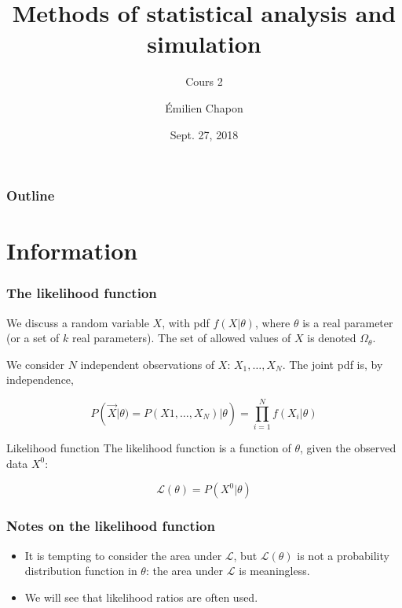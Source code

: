 \documentclass[9pt]{beamer}
\date[Stat2]{Sept. 27, 2018}
\title{Methods of statistical analysis and simulation}
\subtitle{Cours 2}
\author[E. Chapon]{Émilien Chapon}
\begin{document}
{

\begin{frame}
 \maketitle
 
\end{frame}
}



\begin{frame}
 \frametitle{Outline}
 
 \tableofcontents
\end{frame}

\section{Information}

\begin{frame}
 \frametitle{The likelihood function}
 
 We discuss a random variable $X$, with pdf $f(X|\theta)$, where $\theta$ is a real parameter (or a set of $k$ real parameters).
 The set of allowed values of $X$ is denoted $\Omega_\theta$.
 
 We consider $N$ independent observations of $X$: $X_1,\dots,X_N$. The joint pdf is, by independence,
 
 $$P(\vec{X}|\theta) = P(X1,\dots,X_N)|\theta) = \prod_{i=1}^N f(X_i|\theta)$$
 
 \begin{block}{Likelihood function}
  The likelihood function is a function of $\theta$, given the observed data $X^0$:
  
  $$\mathcal{L}(\theta) = P(X^0|\theta)$$
 \end{block}

  
\end{frame}

\begin{frame}
 \frametitle{Notes on the likelihood function}
 
 \begin{itemize}
  \item It is tempting to consider the area under $\mathcal{L}$, but $\mathcal{L}(\theta)$ is not a probability distribution function in $\theta$: \alert{the area under $\mathcal{L}$ is meaningless}.
  \item We will see that likelihood ratios are often used.
 \end{itemize}


\end{frame}
\end{document}
